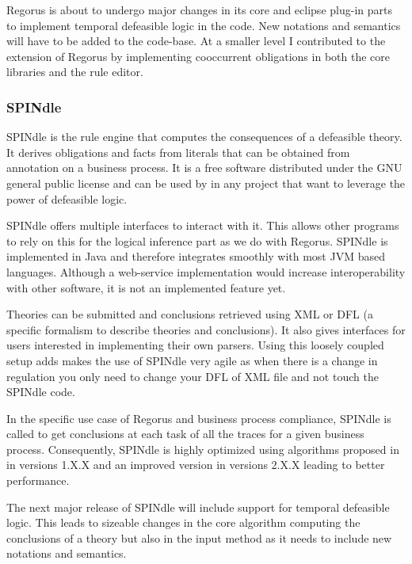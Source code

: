 \documentclass[10pt]{report}
\begin{document}
Regorus is about to undergo major changes in its core and eclipse plug-in parts to implement temporal defeasible logic in the code. New notations and semantics will have to be added to the code-base. At a smaller level I contributed to the extension of Regorus by implementing cooccurrent obligations in both the core libraries and the rule editor.

\subsubsection{SPINdle}

SPINdle is the rule engine that computes the consequences of a defeasible theory. It derives obligations and facts from literals that can be obtained from annotation on a business process. It is a free software distributed under the GNU general public license and can be used by in any project that want to leverage the power of defeasible logic.  \autocite{spindleUserManual}

SPINdle offers multiple interfaces to interact with it. This allows other programs to rely on this for the logical inference part as we do with Regorus. SPINdle is implemented in Java and therefore integrates smoothly with most JVM based languages. Although a web-service implementation would increase interoperability with other software, it is not an implemented feature yet. 

Theories can be submitted and conclusions retrieved using XML or DFL (a specific formalism to describe theories and conclusions). It also gives interfaces for users interested in implementing their own parsers. Using this loosely coupled setup adds makes the use of SPINdle very agile as when there is a change in regulation you only need to change your DFL of XML file and not touch the SPINdle code.

In the specific use case of Regorus and business process compliance, SPINdle is called to get conclusions at each task of all the traces for a given business process. Consequently, SPINdle is highly optimized using algorithms proposed in \autocite{MaherSPINdle} in versions 1.X.X and an improved version \autocite{LamSPINdle} in versions 2.X.X leading to better performance.

The next major release of SPINdle will include support for temporal defeasible logic. This leads to sizeable changes in the core algorithm computing the conclusions of a theory but also in the input method as it needs to include new notations and semantics.
\end{document}
